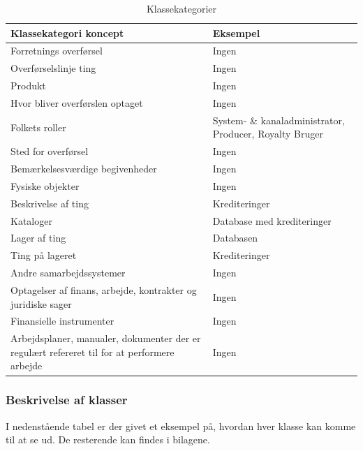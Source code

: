 \begin{table}[H]
    \begin{tabularx}{\textwidth}{|X|X|}
        \hline
        \textbf{Klassekategori koncept} & \textbf{Eksempel} \\
        \hline
        Forretnings overførsel & Ingen\\
        \hline
        Overførselslinje ting & Ingen\\
        \hline
        Produkt & Ingen \\
        \hline
        Hvor bliver overførslen optaget  & Ingen \\
        \hline
        Folkets roller & System- \& kanaladministrator, Producer, Royalty Bruger\\
        \hline
        Sted for overførsel & Ingen \\
        \hline
        Bemærkelsesværdige begivenheder & Ingen \\
        \hline
        Fysiske objekter & Ingen \\
        \hline
        Beskrivelse af ting & Krediteringer\\
        \hline
        Kataloger & Database med krediteringer\\
        \hline
        Lager af ting & Databasen\\
        \hline
        Ting på lageret & Krediteringer\\
        \hline
        Andre samarbejdssystemer & Ingen\\
        \hline
        Optagelser af finans, arbejde, kontrakter og juridiske sager &  Ingen \\
        \hline
        Finansielle instrumenter & Ingen\\
        \hline
        Arbejdsplaner, manualer, dokumenter der er regulært refereret til for at performere arbejde & Ingen\\
        \hline
    \end{tabularx}
    \caption{Klassekategorier}
    \label{table:class_categories}
\end{table}

\subsubsection{Beskrivelse af klasser}
I nedenstående tabel er der givet et eksempel på, hvordan hver klasse kan komme til at se ud. De resterende kan findes i bilagene.
 
